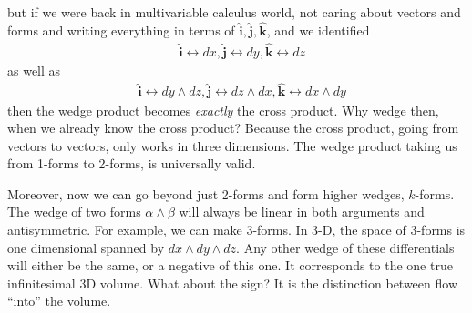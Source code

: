 	but if we were back in multivariable calculus world, not caring about vectors and forms and writing everything in terms of $\hat{\mathbf{i}}, \hat{\mathbf{j}}, \hat{\mathbf{k}}$, and we identified 
	\begin{align*}
		&\hat{\mathbf{i}} \leftrightarrow dx, \hat{\mathbf{j}} \leftrightarrow dy, \hat{\mathbf{k}} \leftrightarrow dz 
	\end{align*}
	as well as
	\begin{align*}
		&\hat{\mathbf{i}} \leftrightarrow dy \wedge dz, \hat{\mathbf{j}} \leftrightarrow dz \wedge dx, \hat{\mathbf{k}} \leftrightarrow dx \wedge dy
	\end{align*}
	then the wedge product becomes \emph{exactly} the cross product. Why wedge then, when we already know the cross product? Because the cross product, going from vectors to vectors, only works in three dimensions. The wedge product taking us from 1-forms to 2-forms, is universally valid.
	
	Moreover, now we can go beyond just 2-forms and form higher wedges, $k$-forms. The wedge of two forms $\alpha \wedge \beta$ will always be linear in both arguments and antisymmetric. For example, we can make 3-forms. In 3-D, the space of 3-forms is one dimensional spanned by $dx \wedge dy \wedge dz$. Any other wedge of these differentials will either be the same, or a negative of this one. It corresponds to the one true infinitesimal 3D volume. What about the sign? It is the distinction between flow ``into'' the volume.
	
	
